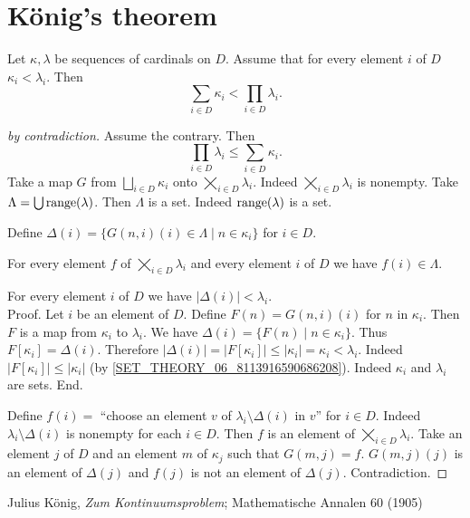 \documentclass{article}
\newcommand{\SumSet}[2]{\bigsqcup_{i \in #2} #1_{i}}
\newcommand{\Sum}[2]{\sum_{i \in #2} #1_{i}}
\newcommand{\ProdSet}[2]{\bigtimes_{i \in #2} #1_{i}}
\newcommand{\Prod}[2]{\prod_{i \in #2} #1_{i}}
\begin{document}
\section*{König's theorem}

\begin{forthel}
  \begin{theorem*}[König]\label{koenig}
    Let $\kappa, \lambda$ be sequences of cardinals on $D$.
    Assume that for every element $i$ of $D$ $\kappa_{i} < \lambda_{i}$.
    Then \[ \Sum{\kappa}{D} < \Prod{\lambda}{D}. \]
  \end{theorem*}
  \begin{proof}[by contradiction]
    Assume the contrary.
    Then \[ \Prod{\lambda}{D} \leq \Sum{\kappa}{D}. \]
    Take a map $G$ from $\SumSet{\kappa}{D}$ onto $\ProdSet{\lambda}{D}$.
    Indeed $\ProdSet{\lambda}{D}$ is nonempty.
    Take $\Lambda = \bigcup \operatorname{range}(\lambda)$.
    Then $\Lambda$ is a set.
    Indeed $\operatorname{range}(\lambda)$ is a set.

    Define $\Delta(i) = \{ G(n,i)(i) \in \Lambda \mid n \in \kappa_{i} \}$ for
    $i \in D$.

    For every element $f$ of $\ProdSet{\lambda}{D}$ and every element $i$ of $D$
    we have $f(i) \in \Lambda$.

    For every element $i$ of $D$ we have $|\Delta(i)| < \lambda_{i}$. \\
    Proof.
      Let $i$ be an element of $D$.
      Define $F(n) = G(n,i)(i)$ for $n$ in $\kappa_{i}$.
      Then $F$ is a map from $\kappa_{i}$ to $\lambda_{i}$.
      We have $\Delta(i) = \{ F(n) \mid n \in \kappa_{i} \}$.
      Thus $F[\kappa_{i}] = \Delta(i)$.
      Therefore $|\Delta(i)|
        = |F[\kappa_{i}]|
        \leq |\kappa_{i}|
        = \kappa_{i}
        < \lambda_{i}$.
      Indeed $|F[\kappa_{i}]| \leq |\kappa_{i}|$
      (by \cref{SET_THEORY_06_8113916590686208}).
      Indeed $\kappa_{i}$ and $\lambda_{i}$ are sets.
    End.

    Define $f(i) =$ ``choose an element $v$ of $\lambda_{i} \setminus
    \Delta(i)$ in $v$'' for $i \in D$.
    Indeed $\lambda_{i} \setminus \Delta(i)$ is nonempty for each $i \in D$.
    Then $f$ is an element of $\ProdSet{\lambda}{D}$.
    Take an element $j$ of $D$ and an element $m$ of $\kappa_{j}$ such that
    $G(m,j) = f$.
    $G(m,j)(j)$ is an element of $\Delta(j)$ and
    $f(j)$ is not an element of $\Delta(j)$.
    Contradiction.
  \end{proof}
\end{forthel}

\begin{thebibliography}{1}
   Julius König,
  \textit{Zum Kontinuumsproblem};
  Mathematische Annalen 60 (1905)
\end{thebibliography}
\end{document}
